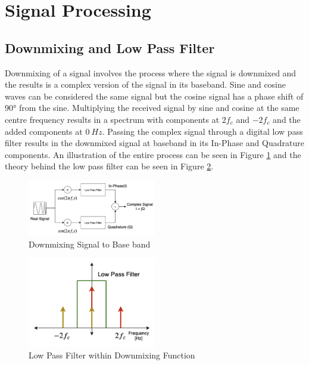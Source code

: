 \section{Signal Processing} 
\subsection{Downmixing and Low Pass Filter}

Downmixing of a signal involves the process where the signal is downmixed and the results is a complex version of the signal in its baseband. Sine and cosine waves can be considered the same signal but the cosine signal has a phase shift of $90 °$ from the sine. Multiplying the received signal by sine and cosine at the same centre frequency results in a spectrum with components at $2f_c$ and $-2f_c$ and the added components at $0\ Hz$. Passing the complex signal through a digital low pass filter results in the downmixed signal at baseband in its In-Phase and Quadrature components. An illustration of the entire process can be seen in Figure \ref{fig:downmix} and the theory behind the low pass filter can be seen in Figure \ref{fig:lpfDownmix}.

\begin{figure}[h!]
    \centering
    \includegraphics[width = 0.5\textwidth]{images/downmix.pdf}
    \caption{Downmixing Signal to Base band}\label{fig:downmix}
\end{figure}

\begin{figure}[h!]
    \centering
    \includegraphics[width = 0.5\textwidth]{images/lpfDownmix.pdf}
    \caption{Low Pass Filter within Downmixing Function}\label{fig:lpfDownmix}
\end{figure}

